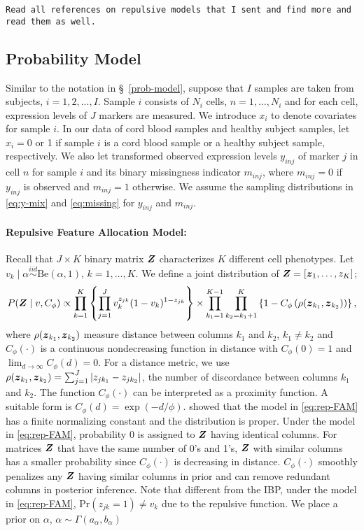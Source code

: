 \documentclass[12pt,]{article}
\newcommand{\p}[1]{\left(#1\right)}
\newcommand{\bc}[1]{ \left\{#1\right\} }
\newcommand{\abs}[1]{ \left|#1\right| }
\newcommand{\iid}{\overset{iid}{\sim}}
\def\Be{\text{Be}}
\def\Prob{\text{Pr}}
\newcommand{\bZ}{\mbox{\boldmath $Z$}}
\newcommand{\bz}{\mbox{\boldmath $z$}}
\begin{document}
{\tt Read all references on repulsive models that I sent and find more and read them as well.  }




\subsection{Probability Model}\label{sec:rep-model}
Similar to the notation in \S~\ref{prob-model}, suppose that $I$ samples are
taken from subjects, \(i = 1,2,...,I\). Sample \(i\)
consists of \(N_i\) cells, \(n=1, \ldots, N_i\) and for each cell,
expression levels of \(J\) markers are measured.  We introduce $x_i$ to denote covariates for sample $i$.  In our data of cord blood samples and healthy subject samples, let $x_i=0$ or 1 if sample $i$ is a cord blood sample or a healthy subject sample, respectively.  We also let transformed observed expression levels $y_{inj}$ of marker $j$ in cell $n$ for sample $i$ and its binary missingness indicator $m_{inj}$, where $m_{inj} = 0$ if $y_{inj}$ is observed and $m_{inj} = 1$ otherwise.  We assume the sampling distributions in \eqref{eq:y-mix} and \eqref{eq:missing} for $y_{inj}$ and $m_{inj}$.

\paragraph*{Repulsive Feature Allocation Model:} Recall that $J\times K$ binary
matrix $\bZ$ characterizes $K$ different cell phenotypes.  Let $v_k \mid \alpha
\iid \Be(\alpha, 1)$, $k=1, \ldots, K.$ We define a joint distribution of
$\bZ=[\bz_1, \ldots, z_K]$;
\begin{eqnarray}
P(\bZ \mid v, C_\phi) \propto \prod_{k=1}^K  \bc{\prod_{j=1}^J
v_k^{z_{jk}}(1-v_k)^{1-z_{jk}}} \times
\prod_{k_1=1}^{K-1}\prod_{k_2=k_1+1}^{K} \left\{1 - C_\phi\p{\rho(\bz_{k_1}, \bz_{k_2})}\right\},  \label{eq:rep-FAM}
\end{eqnarray}
where $\rho(\bz_{k_1}, \bz_{k_2})$ measure distance between columns $k_1$ and
$k_2$, $k_1 \neq k_2$ and $C_\phi(\cdot)$ is a continuous nondecreasing
function in distance with $C_\phi(0)=1$ and
$\lim_{d\rightarrow\infty}C_\phi(d)= 0$. For a distance metric, we use
$\rho(\bz_{k_1}, \bz_{k_2})=\sum_{j=1}^J \abs{z_{jk_1} - z_{jk_2}}$, the number
of discordance between columns $k_1$ and $k_2$.  The function $C_\phi(\cdot)$
can be interpreted as a proximity function. A suitable form is $C_\phi(d) =
\exp\p{-d/\phi}$. \cite{quinlan2017parsimonious} showed that the model in
\eqref{eq:rep-FAM} has a finite normalizing constant and the distribution is
proper.  Under the model in \eqref{eq:rep-FAM}, probability 0 is assigned to
$\bZ$ having identical columns.  For matrices $\bZ$ that have the same number
of 0's and 1's, $\bZ$ with similar columns has a smaller probability since
$C_\phi(\cdot)$ is decreasing in distance. $C_\phi(\cdot)$ smoothly penalizes
any $\bZ$ having similar columns in prior and can remove redundant columns in
posterior inference. Note that different from the IBP, under the model in
\eqref{eq:rep-FAM}, $\Prob(z_{jk}=1) \neq v_k$ due to the repulsive function.
We place a prior on $\alpha$, $\alpha \sim \Gamma(a_\alpha, b_\alpha)$
\end{document}
